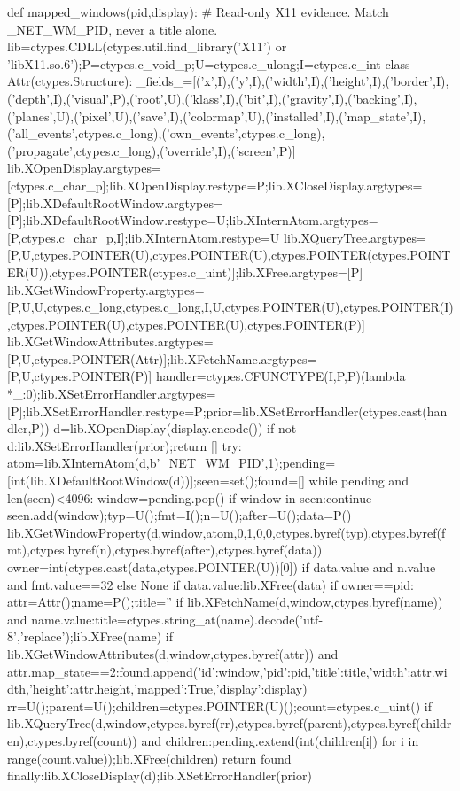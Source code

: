 def mapped_windows(pid,display):
 # Read-only X11 evidence. Match _NET_WM_PID, never a title alone.
 lib=ctypes.CDLL(ctypes.util.find_library('X11') or 'libX11.so.6');P=ctypes.c_void_p;U=ctypes.c_ulong;I=ctypes.c_int
 class Attr(ctypes.Structure):
  _fields_=[('x',I),('y',I),('width',I),('height',I),('border',I),('depth',I),('visual',P),('root',U),('klass',I),('bit',I),('gravity',I),('backing',I),('planes',U),('pixel',U),('save',I),('colormap',U),('installed',I),('map_state',I),('all_events',ctypes.c_long),('own_events',ctypes.c_long),('propagate',ctypes.c_long),('override',I),('screen',P)]
 lib.XOpenDisplay.argtypes=[ctypes.c_char_p];lib.XOpenDisplay.restype=P;lib.XCloseDisplay.argtypes=[P];lib.XDefaultRootWindow.argtypes=[P];lib.XDefaultRootWindow.restype=U;lib.XInternAtom.argtypes=[P,ctypes.c_char_p,I];lib.XInternAtom.restype=U
 lib.XQueryTree.argtypes=[P,U,ctypes.POINTER(U),ctypes.POINTER(U),ctypes.POINTER(ctypes.POINTER(U)),ctypes.POINTER(ctypes.c_uint)];lib.XFree.argtypes=[P]
 lib.XGetWindowProperty.argtypes=[P,U,U,ctypes.c_long,ctypes.c_long,I,U,ctypes.POINTER(U),ctypes.POINTER(I),ctypes.POINTER(U),ctypes.POINTER(U),ctypes.POINTER(P)]
 lib.XGetWindowAttributes.argtypes=[P,U,ctypes.POINTER(Attr)];lib.XFetchName.argtypes=[P,U,ctypes.POINTER(P)]
 handler=ctypes.CFUNCTYPE(I,P,P)(lambda *_:0);lib.XSetErrorHandler.argtypes=[P];lib.XSetErrorHandler.restype=P;prior=lib.XSetErrorHandler(ctypes.cast(handler,P))
 d=lib.XOpenDisplay(display.encode())
 if not d:lib.XSetErrorHandler(prior);return []
 try:
  atom=lib.XInternAtom(d,b'_NET_WM_PID',1);pending=[int(lib.XDefaultRootWindow(d))];seen=set();found=[]
  while pending and len(seen)<4096:
   window=pending.pop()
   if window in seen:continue
   seen.add(window);typ=U();fmt=I();n=U();after=U();data=P()
   lib.XGetWindowProperty(d,window,atom,0,1,0,0,ctypes.byref(typ),ctypes.byref(fmt),ctypes.byref(n),ctypes.byref(after),ctypes.byref(data))
   owner=int(ctypes.cast(data,ctypes.POINTER(U))[0]) if data.value and n.value and fmt.value==32 else None
   if data.value:lib.XFree(data)
   if owner==pid:
    attr=Attr();name=P();title=''
    if lib.XFetchName(d,window,ctypes.byref(name)) and name.value:title=ctypes.string_at(name).decode('utf-8','replace');lib.XFree(name)
    if lib.XGetWindowAttributes(d,window,ctypes.byref(attr)) and attr.map_state==2:found.append({'id':window,'pid':pid,'title':title,'width':attr.width,'height':attr.height,'mapped':True,'display':display})
   rr=U();parent=U();children=ctypes.POINTER(U)();count=ctypes.c_uint()
   if lib.XQueryTree(d,window,ctypes.byref(rr),ctypes.byref(parent),ctypes.byref(children),ctypes.byref(count)) and children:pending.extend(int(children[i]) for i in range(count.value));lib.XFree(children)
  return found
 finally:lib.XCloseDisplay(d);lib.XSetErrorHandler(prior)

